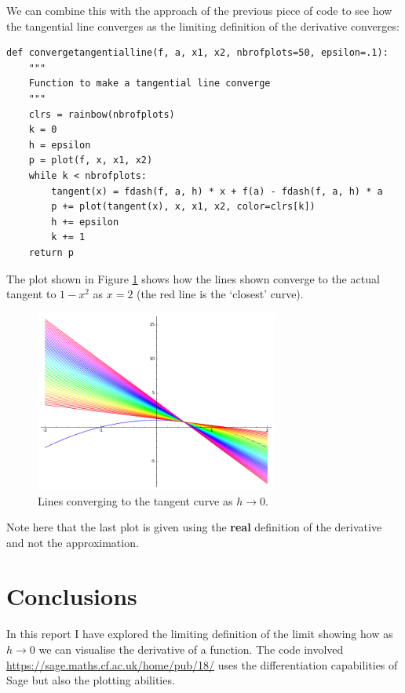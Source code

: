 \documentclass[a4paper]{article}
\theoremstyle{break}
\begin{document}
We can combine this with the approach of the previous piece of code to see how the tangential line converges as the limiting definition of the derivative converges:

\begin{verbatim}
def convergetangentialline(f, a, x1, x2, nbrofplots=50, epsilon=.1):
    """
    Function to make a tangential line converge
    """
    clrs = rainbow(nbrofplots)
    k = 0
    h = epsilon
    p = plot(f, x, x1, x2)
    while k < nbrofplots:
        tangent(x) = fdash(f, a, h) * x + f(a) - fdash(f, a, h) * a
        p += plot(tangent(x), x, x1, x2, color=clrs[k])
        h += epsilon
        k += 1
    return p
\end{verbatim}

The plot shown in Figure \ref{lines} shows how the lines shown converge to the actual tangent to $1-x^2$ as $x=2$ (the red line is the `closest' curve).

\begin{figure}[!htbp]
\begin{center}
\includegraphics[width=8cm]{sage0.png}
\end{center}
\caption{Lines converging to the tangent curve as $h\to0$.}\label{lines}
\end{figure}

Note here that the last plot is given using the \textbf{real} definition of the derivative and not the approximation.

\section{Conclusions}

In this report I have explored the limiting definition of the limit showing how as $h\to 0$ we can visualise the derivative of a function. The code involved \url{https://sage.maths.cf.ac.uk/home/pub/18/} uses the differentiation capabilities of Sage but also the plotting abilities.
\end{document}
